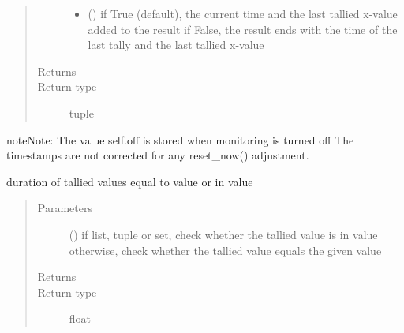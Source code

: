 \documentclass[letterpaper,10pt,english]{sphinxmanual}
\begin{document}
\begin{fulllineitems}
\begin{fulllineitems}
\begin{quote}
\begin{description}
\begin{itemize}
\item {} 
 () \textendash{} if True (default), the current time and the last tallied x-value added to the result 
if False, the result ends with the time of the last tally and the last tallied x-value

\end{itemize}

\item[{Returns}] \leavevmode
{}

\item[{Return type}] \leavevmode
tuple

\end{description}\end{quote}

\begin{sphinxadmonition}{note}{Note:}
The value self.off is stored when monitoring is turned off 
The timestamps are not corrected for any reset\_now() adjustment.
\end{sphinxadmonition}

\end{fulllineitems}


\begin{fulllineitems}
\label{\detokenize{Reference:salabim.MonitorTimestamp.value_duration}}
duration of tallied values equal to value or in value
\begin{quote}\begin{description}
\item[{Parameters}] \leavevmode
{} () \textendash{} if list, tuple or set, check whether the tallied value is in value 
otherwise, check whether the tallied value equals the given value

\item[{Returns}] \leavevmode
{}

\item[{Return type}] \leavevmode
float

\end{description}\end{quote}

\end{fulllineitems}


\end{fulllineitems}
\end{document}
